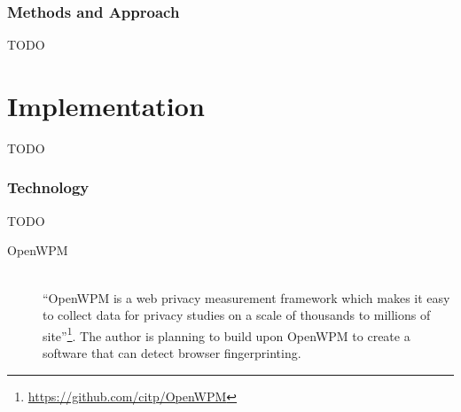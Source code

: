 \documentclass[a4paper, 12pt]{scrreprt}
\begin{document}
    \subsection{Methods and Approach}
    TODO

\chapter{Implementation}
TODO

    \subsection{Technology}
    TODO

    \begin{description}
        \item[OpenWPM] \hfill \\
            ``OpenWPM is a web privacy measurement framework which makes it easy to collect data for privacy studies on a scale
            of thousands to millions of site''\footnote{\url{https://github.com/citp/OpenWPM}}.
            The author is planning to build upon OpenWPM to create a software that can detect browser fingerprinting.\cite{englehardt2016census}
    \end{description}

\clearpage

\printbibliography
\end{document}
